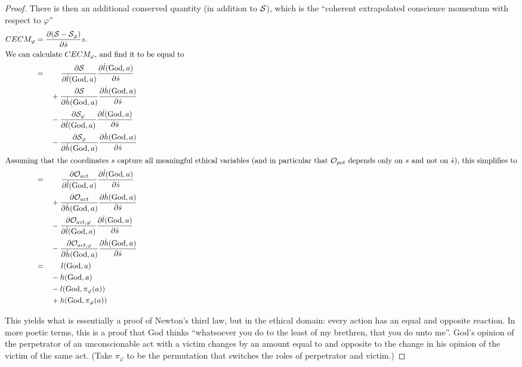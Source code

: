 \documentclass{article}
\begin{document}
\begin{proof}
  There is then an additional conserved quantity (in addition to
  ${\mathcal S}$), which is the ``coherent extrapolated conscience momentum
  with respect to $\varphi$''
  \begin{align*}
CECM_\varphi &= \frac{\partial ({\mathcal S} - {\mathcal S}_\varphi)}{\partial \dot{s}} s. \\
\intertext{We can calculate $CECM_\varphi$, and find it to be equal to}
&= \qquad \frac{\partial {\mathcal S}}{\partial \dot{l}(\mathrm{God}, a)} \frac{\partial \dot{l}(\mathrm{God}, a)}{\partial \dot{s}}\\
&\qquad + \frac{\partial {\mathcal S}}{\partial \dot{h}(\mathrm{God}, a)} \frac{\partial \dot{h}(\mathrm{God}, a)}{\partial \dot{s}}\\
&\qquad - \frac{\partial {\mathcal S}_\varphi}{\partial \dot{l}(\mathrm{God}, a)} \frac{\partial \dot{l}(\mathrm{God}, a)}{\partial \dot{s}}\\
&\qquad - \frac{\partial {\mathcal S}_\varphi}{\partial \dot{h}(\mathrm{God}, a)} \frac{\partial \dot{h}(\mathrm{God}, a)}{\partial \dot{s}}\\
\intertext{Assuming that the coordinates $s$ capture all meaningful
  ethical variables (and in particular that ${\mathcal O}_{pot}$ depends only
  on $s$ and not on $\dot{s}$), this simplifies to}
&= \qquad \frac{\partial {\mathcal O}_{act}}{\partial \dot{l}(\mathrm{God}, a)} \frac{\partial \dot{l}(\mathrm{God}, a)}{\partial \dot{s}}\\
&\qquad + \frac{\partial {\mathcal O}_{act}}{\partial \dot{h}(\mathrm{God}, a)} \frac{\partial \dot{h}(\mathrm{God}, a)}{\partial \dot{s}}\\
&\qquad - \frac{\partial {\mathcal O}_{act, \varphi}}{\partial \dot{l}(\mathrm{God}, a)} \frac{\partial \dot{l}(\mathrm{God}, a)}{\partial \dot{s}}\\
&\qquad - \frac{\partial {\mathcal O}_{act, \varphi}}{\partial \dot{h}(\mathrm{God}, a)} \frac{\partial \dot{h}(\mathrm{God}, a)}{\partial \dot{s}}\\
&= \qquad l(\mathrm{God}, a) \\
&\qquad - h(\mathrm{God}, a) \\
&\qquad - l(\mathrm{God}, \pi_\varphi(a)) \\
&\qquad + h(\mathrm{God}, \pi_\varphi(a)) \\
  \end{align*}

This yields what is essentially a proof of Newton's third law, but in
the ethical domain: every action has an equal and opposite
reaction. In more poetic terms, this is a proof that God thinks
``whatsoever you do to the least of my brethren, that you do unto
me''. God's opinion of the perpetrator of an unconscionable act with a
victim changes by an amount equal to and opposite to the change in his
opinion of the victim of the same act. (Take $\pi_\varphi$ to be the
permutation that switches the roles of perpetrator and victim.)
  

\end{proof}
\end{document}
